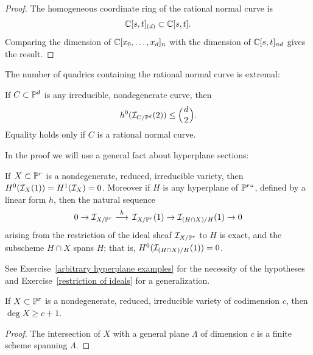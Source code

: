 \begin{proof}
The
homogeneous coordinate ring
%
of the rational normal curve is
$${\mathbb C}[s,t]_{(d)}\subset {\mathbb C}[s,t].$$
Comparing the dimension
of ${\mathbb C}[x_0,\dots,x_d]_n$ with the dimension of ${\mathbb C}[s,t]_{nd}$ gives the result.
\end{proof}

The number of quadrics containing the
rational normal curve
%
is extremal:
%
%

\begin{proposition}\label{rnc on most quadrics}
If $C \subset {\mathbb P}^d$ is any irreducible, nondegenerate curve, then
$$
h^0(\cI_{C/\PP^d}(2)) \leq  \mbinom{d}{2}.
$$
Equality holds only if
$C$ is a rational normal curve.
\unif
\end{proposition}

In the proof we will use a general fact about hyperplane sections:
%

\begin{proposition}\label{arbitrary hyperplane}
If $\kern1ptX\subset {\mathbb P}^r$ is a nondegenerate, reduced, irreducible variety,
then $H^0({\mathcal I}_X(1)) = H^1 ({\mathcal I}_X) = 0$.
Moreover if $H$ is any hyperplane of ${\mathbb P}^r` `$, defined by
a linear form $h$, then the natural
sequence
$$
0\to \sI_{X/\PP^r} \ruto {\ h} \sI_{X/\PP^r}(1)\to \sI_{(H\cap X)/H}(1)\to 0
$$
arising from the restriction of the ideal sheaf ${\mathcal I}_{X/{\mathbb P}^r}$ to $H$ is exact, and the subscheme
$H\cap X$ spans $H$; that is, $H^0({\mathcal I}_{(H\cap X)/H}(1)) = 0$.
\unif
\end{proposition}

See Exercise~\ref{arbitrary hyperplane examples} for the necessity of the hypotheses
and Exercise~\ref{restriction of ideals} for a generalization.

\begin{corollary}\label{minimal degree bound}
If $X\subset {\mathbb P}^r$ is a nondegenerate, reduced, irreducible variety of codimension $c$, then $\deg X \geq c+1$.
\unif
\end{corollary}

\begin{proof}
 The intersection of $X$ with a general plane $\Lambda$ of dimension $c$ is a finite scheme spanning $\Lambda$.
\unif
\end{proof}

